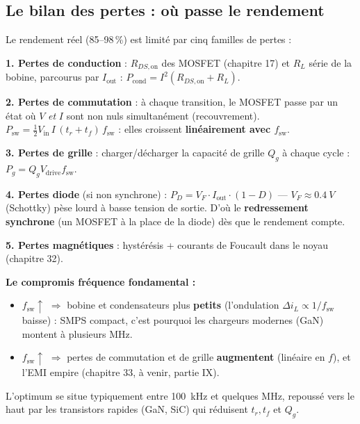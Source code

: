 \documentclass[12pt,a4paper,twoside]{book}
\begin{document}
\subsection{Le bilan des pertes : où passe le rendement}

\begin{formule}
Le rendement réel (85--98\,\%) est limité par cinq familles de pertes :

\textbf{1. Pertes de conduction} : $R_{DS,\text{on}}$ des MOSFET (chapitre 17) et $R_L$ série de la bobine, parcourus par $I_{\text{out}}$ : $P_{\text{cond}} = I^2 (R_{DS,\text{on}} + R_L)$.

\textbf{2. Pertes de commutation} : à chaque transition, le MOSFET passe par un état où $V$ \textit{et} $I$ sont non nuls simultanément (recouvrement). $P_{\text{sw}} = \frac{1}{2}V_{\text{in}}\,I\,(t_r + t_f)\,f_{\text{sw}}$ : elles croissent \textbf{linéairement avec $f_{\text{sw}}$}.

\textbf{3. Pertes de grille} : charger/décharger la capacité de grille $Q_g$ à chaque cycle : $P_g = Q_g V_{\text{drive}} f_{\text{sw}}$.

\textbf{4. Pertes diode} (si non synchrone) : $P_D = V_F \cdot I_{\text{out}} \cdot (1-D)$ --- $V_F \approx \SI{0.4}{V}$ (Schottky) pèse lourd à basse tension de sortie. D'où le \textbf{redressement synchrone} (un MOSFET à la place de la diode) dès que le rendement compte.

\textbf{5. Pertes magnétiques} : hystérésis + courants de Foucault dans le noyau (chapitre 32).
\end{formule}

\begin{attention}
\textbf{Le compromis fréquence fondamental :}
\begin{itemize}[nosep]
\item $f_{\text{sw}} \uparrow$ $\Rightarrow$ bobine et condensateurs plus \textbf{petits} (l'ondulation $\Delta i_L \propto 1/f_{\text{sw}}$ baisse) : SMPS compact, c'est pourquoi les chargeurs modernes (GaN) montent à plusieurs MHz.
\item $f_{\text{sw}} \uparrow$ $\Rightarrow$ pertes de commutation et de grille \textbf{augmentent} (linéaire en $f$), et l'EMI empire (chapitre 33, à venir, partie IX).
\end{itemize}
L'optimum se situe typiquement entre \SI{100}{kHz} et quelques MHz, repoussé vers le haut par les transistors rapides (GaN, SiC) qui réduisent $t_r, t_f$ et $Q_g$.
\end{attention}
\end{document}
